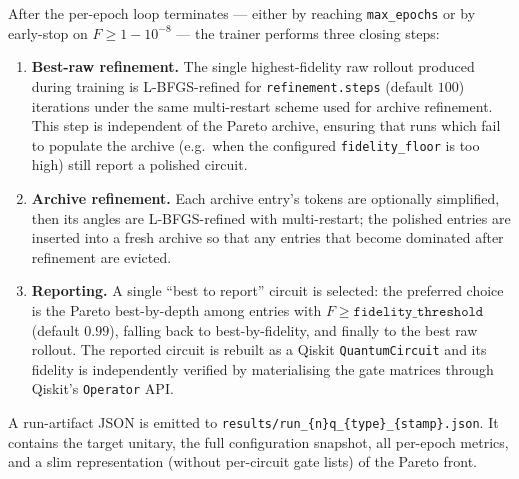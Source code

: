 \documentclass[11pt,a4paper]{article}
\begin{document}
After the per-epoch loop terminates --- either by reaching \texttt{max\_epochs} or by early-stop on $F \ge 1 - 10^{-8}$ --- the trainer performs three closing steps:
\begin{enumerate}[leftmargin=2em]
  \item \textbf{Best-raw refinement.} The single highest-fidelity raw rollout produced during training is L-BFGS-refined for \texttt{refinement.steps} (default $100$) iterations under the same multi-restart scheme used for archive refinement. This step is independent of the Pareto archive, ensuring that runs which fail to populate the archive (e.g.\ when the configured \texttt{fidelity\_floor} is too high) still report a polished circuit.
  \item \textbf{Archive refinement.} Each archive entry's tokens are optionally simplified, then its angles are L-BFGS-refined with multi-restart; the polished entries are inserted into a fresh archive so that any entries that become dominated after refinement are evicted.
  \item \textbf{Reporting.} A single ``best to report'' circuit is selected: the preferred choice is the Pareto best-by-depth among entries with $F \ge \texttt{fidelity\_threshold}$ (default $0.99$), falling back to best-by-fidelity, and finally to the best raw rollout. The reported circuit is rebuilt as a Qiskit \texttt{QuantumCircuit} and its fidelity is independently verified by materialising the gate matrices through Qiskit's \texttt{Operator} API.
\end{enumerate}

A run-artifact JSON is emitted to \texttt{results/run\_\{n\}q\_\{type\}\_\{stamp\}.json}. It contains the target unitary, the full configuration snapshot, all per-epoch metrics, and a slim representation (without per-circuit gate lists) of the Pareto front.
\end{document}
